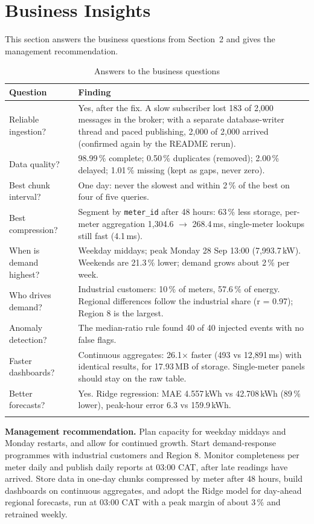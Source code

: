 \documentclass[11pt,a4paper]{article}
\begin{document}
\section{Business Insights}

This section answers the business questions from Section~2 and gives the management recommendation.

\begin{longtable}{p{4cm}p{10.5cm}}
\toprule
\textbf{Question} & \textbf{Finding} \\
\midrule
\endhead
Reliable ingestion? & Yes, after the fix. A slow subscriber lost 183 of 2,000 messages in the broker; with a separate database-writer thread and paced publishing, 2,000 of 2,000 arrived (confirmed again by the README rerun). \\
\addlinespace
Data quality? & 98.99\,\% complete; 0.50\,\% duplicates (removed); 2.00\,\% delayed; 1.01\,\% missing (kept as gaps, never zero). \\
\addlinespace
Best chunk interval? & One day: never the slowest and within 2\,\% of the best on four of five queries. \\
\addlinespace
Best compression? & Segment by \texttt{meter\_id} after 48 hours: 63\,\% less storage, per-meter aggregation 1,304.6 $\rightarrow$ 268.4\,ms, single-meter lookups still fast (4.1\,ms). \\
\addlinespace
When is demand highest? & Weekday middays; peak Monday 28 Sep 13:00 (7,993.7\,kW). Weekends are 21.3\,\% lower; demand grows about 2\,\% per week. \\
\addlinespace
Who drives demand? & Industrial customers: 10\,\% of meters, 57.6\,\% of energy. Regional differences follow the industrial share (r = 0.97); Region 8 is the largest. \\
\addlinespace
Anomaly detection? & The median-ratio rule found 40 of 40 injected events with no false flags. \\
\addlinespace
Faster dashboards? & Continuous aggregates: 26.1$\times$ faster (493 vs 12,891\,ms) with identical results, for 17.93\,MB of storage. Single-meter panels should stay on the raw table. \\
\addlinespace
Better forecasts? & Yes. Ridge regression: MAE 4.557\,kWh vs 42.708\,kWh (89\,\% lower), peak-hour error 6.3 vs 159.9\,kWh. \\
\bottomrule
\caption{Answers to the business questions}
\end{longtable}

\textbf{Management recommendation.} Plan capacity for weekday middays and Monday restarts, and allow for continued growth. Start demand-response programmes with industrial customers and Region 8. Monitor completeness per meter daily and publish daily reports at 03:00 CAT, after late readings have arrived. Store data in one-day chunks compressed by meter after 48 hours, build dashboards on continuous aggregates, and adopt the Ridge model for day-ahead regional forecasts, run at 03:00 CAT with a peak margin of about 3\,\% and retrained weekly.
\end{document}
